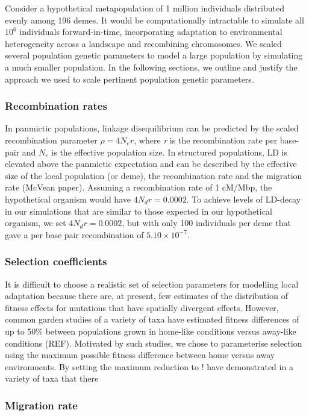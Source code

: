 \documentclass[11pt,twoside,lineno]{GSA_format}
\begin{document}
Consider a hypothetical metapopulation of 1 million individuals distributed evenly among 196 demes. It would be computationally intractable to simulate all $10^6$ individuals forward-in-time, incorporating adaptation to environmental heterogeneity across a landscape and recombining chromosomes. We scaled several population genetic parameters to model a large population by simulating a much smaller population. In the following sections, we outline and justify the approach we used to scale pertinent population genetic parameters. 

\subsubsection{Recombination rates}

In panmictic populations, linkage disequilibrium can be predicted by the scaled recombination parameter $\rho = 4N_er$, where \textit{r} is the recombination rate per base-pair and $N_e$ is the effective population size. In structured populations, LD is elevated above the panmictic expectation and can be described by the effective size of the local population (or deme), the recombination rate and the migration rate (McVean paper). Assuming a recombination rate of 1 cM/Mbp, the hypothetical organism would have $4N_dr = 0.0002$. To achieve levels of LD-decay in our simulations that are similar to those expected in our hypothetical organism, we set $4N_dr = 0.0002$, but with only 100 individuals per deme that gave a per base pair recombination of $5.10 \times 10^{-7}$.

\subsubsection{Selection coefficients} 

It is difficult to choose a realistic set of selection parameters for modelling local adaptation because there are, at present, few estimates of the distribution of fitness effects for mutations that have spatially divergent effects. However, common garden studies of a variety of taxa have estimated fitness differences of up to 50\% between populations grown in home-like conditions versus away-like conditions (REF). Motivated by such studies, we chose to parameterise selection using the maximum possible fitness difference between home versus away environments. By setting the maximum reduction to $!$
have demonstrated in a variety of taxa that there 

\subsubsection{Migration rate} 
\end{document}
